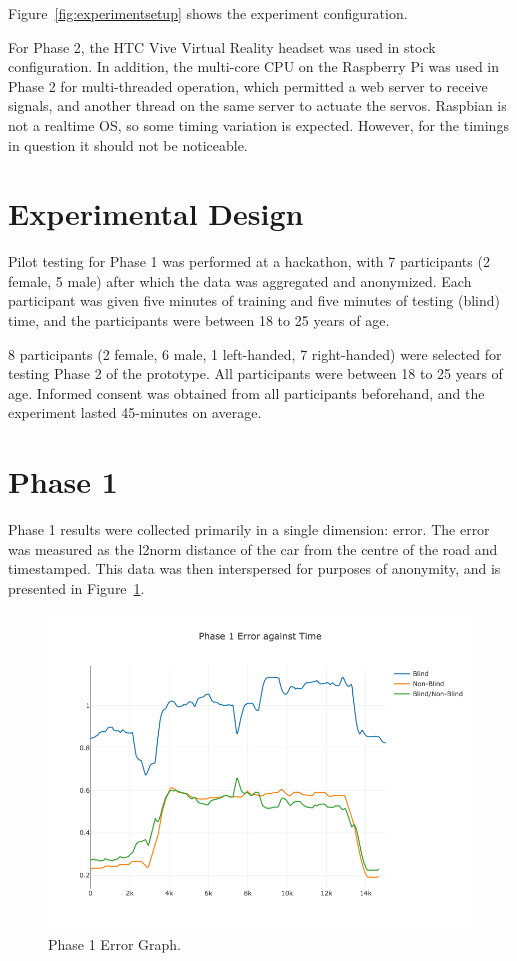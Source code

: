 \documentclass[
12pt, %
oneside, %
english, %
doublespacing, %
headsepline, %
]{MastersDoctoralThesis} %
\begin{document}
Figure~\ref{fig:experimentsetup} shows the experiment configuration.

For Phase 2, the HTC Vive Virtual Reality headset was used in stock configuration. In addition, the multi-core CPU on the Raspberry Pi was used in Phase 2 for multi-threaded operation, which permitted a web server to receive signals, and another thread on the same server to actuate the servos. Raspbian is not a realtime OS, so some timing variation is expected. However, for the timings in question it should not be noticeable.

\section{Experimental Design}

Pilot testing for Phase 1 was performed at a hackathon, with 7 participants (2 female, 5 male) after which the data was aggregated and anonymized. Each participant was given five minutes of training and five minutes of testing (blind) time, and the participants were between 18 to 25 years of age.

8 participants (2 female, 6 male, 1 left-handed, 7 right-handed) were selected for testing Phase 2 of the prototype. All participants were between 18 to 25 years of age. Informed consent was obtained from all participants beforehand, and the experiment lasted 45-minutes on average.

\section{Phase 1}

Phase 1 results were collected primarily in a single dimension: error. The error was measured as the l2norm distance of the car from the centre of the road and timestamped. This data was then interspersed for purposes of anonymity, and is presented in Figure~\ref{fig:p1error}.

\begin{figure}[h]
	\centering\includegraphics[width=1\linewidth]{images/p1error}
	\decoRule
	\caption[Phase 1 Error]{Phase 1 Error Graph.}
	\label{fig:p1error}
\end{figure}
\end{document}
